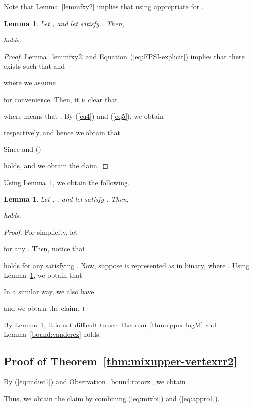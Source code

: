 \documentclass[letter, 11pt]{article}
\newcommand{\1}{\mbox{1}\hspace{-0.25em}\mbox{l}}
\newtheorem{lemma}[theorem]{Lemma}
\begin{document}
 Note that Lemma~\ref{lemmfxy2} implies that 
  using appropriate  for . 

\begin{lemma}\label{lemmIvu1}
 Let , and let  satisfy . 
 Then, 

holds. 
\end{lemma}
\begin{proof}
 Lemma~\ref{lemmfxy2} and Equation~(\ref{eq:FPSI-explicit}) implies that 
  there exists  such that  and 

 where we assume 

  for convenience. 
 Then, it is clear that 
 
 where  means that . 
By (\ref{eq4}) and (\ref{eq5}), we obtain 

 respectively, and hence we obtain that 

 Since  and 
   (), 

 holds, and we obtain the claim. 
\end{proof}
Using Lemma~\ref{lemmIvu1}, 
  we obtain the following.  
\begin{lemma}\label{theoIvu3}
 Let , , and let  satisfy . 
 Then, 

  holds. \end{lemma}
\begin{proof}
 For simplicity, 
  let 

 for any . 
 Then, notice that 

  holds for any  satisfying . 
 Now, suppose  is represented as 
   in binary, 
  where . 
 Using Lemma~\ref{lemmIvu1}, we obtain that 

 In a similar way, 
  we also have 

 and we obtain the claim. 
\end{proof}
By Lemma~\ref{theoIvu3}, it is not difficult to see 
 Theorem~\ref{thm:upper-logM} and Lemma~\ref{bound:vandercz} holds. 

\subsection{Proof of Theorem~\ref{thm:mixupper-vertexrr2}}\label{appendix:rotor}
By (\ref{eq:mdisc1}) and Observation~\ref{bound:rotorz}, we obtain 

Thus, we obtain the claim by combining (\ref{eq:mixbi}) and (\ref{eq:appro1}).
\end{document}
